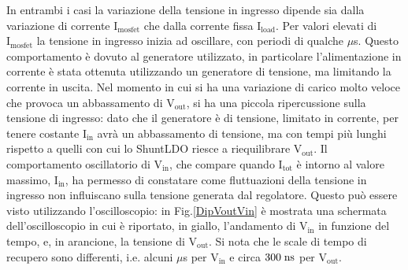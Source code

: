 In entrambi i casi la variazione della tensione in ingresso dipende sia dalla variazione di corrente $\mathrm{I_{mosfet}}$ che dalla corrente fissa $\mathrm{I_{load}}$. 
Per valori elevati di $\mathrm{I_{mosfet}}$ la tensione in ingresso inizia ad oscillare, con periodi di qualche $\mu$s.
Questo comportamento è dovuto al generatore utilizzato, in particolare l'alimentazione in corrente è stata ottenuta utilizzando un generatore di tensione, ma limitando la corrente in uscita. 
Nel momento in cui si ha una variazione di carico molto veloce che provoca un abbassamento di $\mathrm{V_{out}}$, si ha una piccola ripercussione sulla tensione di ingresso: dato che il generatore è di tensione, limitato in corrente, per tenere costante $\mathrm{I_{in}}$ avrà un abbassamento di tensione, ma con tempi più lunghi rispetto a quelli con cui lo ShuntLDO riesce a riequilibrare $\mathrm{V_{out}}$.
Il comportamento oscillatorio di $\mathrm{V_{in}}$, che compare quando $\mathrm{I_{tot}}$ è intorno al valore massimo, $\mathrm{I_{in}}$, ha permesso di constatare come fluttuazioni della tensione in ingresso non influiscano sulla tensione generata dal regolatore.
Questo può essere visto utilizzando l'oscilloscopio: in Fig.\ref{DipVoutVin} è mostrata una schermata dell'oscilloscopio in cui è riportato, in giallo, l'andamento di $\mathrm{V_{in}}$ in funzione del tempo, e, in arancione, la tensione di $\mathrm{V_{out}}$.
Si nota che le scale di tempo di recupero sono differenti, i.e. alcuni $\mu$s per $\mathrm{V_{in}}$ e circa $300 \rm \; ns$ per $\mathrm{V_{out}}$.

